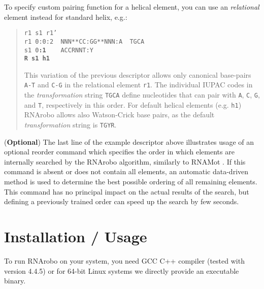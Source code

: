 \documentclass[11pt]{article}
\begin{document}
To specify custom pairing function for a helical element, you can use an \emph{relational} element instead for standard helix, e.g.:
\begin{quote}
\texttt{r1 s1 r1'}\\
\texttt{r1 0:0:2 ~NNN**CC:GG**NNN:A ~TGCA}\\
\texttt{s1 0\textbf{:1} ~~~ACCRNNT:Y} \\
\texttt{\textbf{R s1 h1}}

This variation of the previous descriptor allows only canonical base-pairs \texttt{A-T} and \texttt{C-G} in the relational element \texttt{r1}. The individual IUPAC codes in the \emph{transformation} string \texttt{TGCA} define nucleotides that can pair with \texttt{A}, \texttt{C}, \texttt{G}, and \texttt{T}, respectively in this order. For default helical elements (e.g. \texttt{h1}) RNArobo allows also Watson-Crick base pairs, as the default \emph{transformation} string is \texttt{TGYR}.
\end{quote}

(\textbf{Optional}) The last line of the example descriptor above illustrates usage of an optional reorder command which specifies the order in which elements are internally searched by the RNArobo algorithm, similarly to RNAMot \cite{gautheret1990}. If this command is absent or does not contain all elements, an automatic data-driven method is used to determine the best possible ordering of all remaining elements. This command has no principal impact on the actual results of the search, but defining a previously trained order can speed up the search by few seconds.

\section*{Installation / Usage}
To run RNArobo on your system, you need GCC C++ compiler (tested with version 4.4.5) or for 64-bit Linux systems we directly provide an executable binary.
\end{document}
